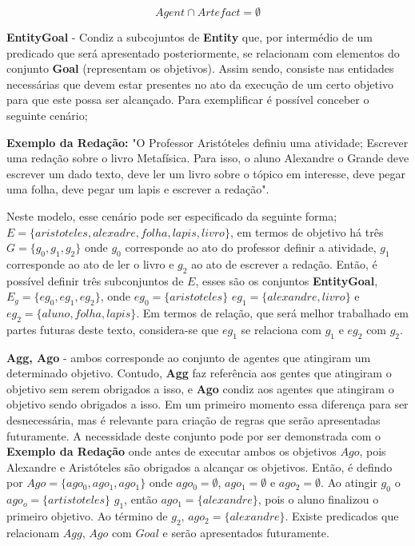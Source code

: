 \begin{equation} \label{agentsartefactvoid}
    Agent \cap Artefact = \emptyset
\end{equation}


\textbf{EntityGoal} - Condiz a subcojuntos de \textbf{Entity} que, por intermédio de um predicado que será apresentado posteriormente, se relacionam 
com elementos do conjunto \textbf{Goal} (representam os objetivos). Assim sendo, consiste nas entidades necessárias que devem estar presentes no 
ato da execução de um certo objetivo para que este possa ser alcançado. Para exemplificar é possível conceber o seguinte cenário; 

\textbf{Exemplo da Redação:} "O Professor Aristóteles definiu uma atividade; Escrever uma redação sobre o livro Metafísica. Para isso, o aluno Alexandre o Grande deve escrever um dado texto, deve ler um livro sobre o tópico em interesse, deve pegar uma folha, deve pegar um lapis e escrever a redação".  


Neste modelo, esse cenário pode 
ser especificado da seguinte forma; $E = \{aristoteles, alexadre, folha, lapis, livro\}$, em termos de objetivo há três $G = \{ g_0, g_1,g_2\}$  onde $g_0$ corresponde ao ato do professor definir a atividade, $g_1$ corresponde ao ato de ler o livro e $g_2$ ao ato de escrever a redação. Então, é possível definir três subconjuntos de $E$, esses são os conjuntos \textbf{EntityGoal},
$E_g = \{ eg_{0}, eg_{1}, eg_{2} \}$, onde $eg_{0} = \{ aristoteles \}$ $eg_{1} = \{ alexandre, livro\}$ e $eg_{2} = \{ aluno, folha, lapis \}$. Em termos de relação, que será melhor trabalhado 
em partes futuras deste texto, considera-se que $eg_1$ se relaciona com $g_1$ e $eg_2$ com $g_2$.

\textbf{Agg, Ago} - ambos corresponde ao conjunto de agentes que atingiram um determinado objetivo. Contudo, \textbf{Agg} faz referência aos gentes que 
atingiram o objetivo sem serem obrigados a isso, e \textbf{Ago} condiz aos agentes que atingiram o objetivo sendo obrigados a isso. Em um primeiro momento
essa diferença para ser desnecessária, mas é relevante para criação de regras que serão apresentadas futuramente. A necessidade deste conjunto pode 
por ser demonstrada com o \textbf{Exemplo da Redação} onde antes de executar ambos os objetivos $Ago$, pois Alexandre e Aristóteles são obrigados a alcançar os objetivos. Então, é defindo por $Ago = \{ ago_0, ago_1, ago_1 \}$ onde $ago_0 = \emptyset$, $ago_1 = \emptyset$ e $ago_2 = \emptyset$. Ao atingir $g_0$ o $ago_o = \{ artistoteles\}$ $g_1$, então $ago_1 = \{ alexandre \}$, pois o aluno finalizou 
o primeiro objetivo. Ao término de $g_2$, $ago_2 = \{ alexandre \}$. Existe predicados que relacionam $Agg$, $Ago$ com $Goal$ e serão apresentados futuramente.


